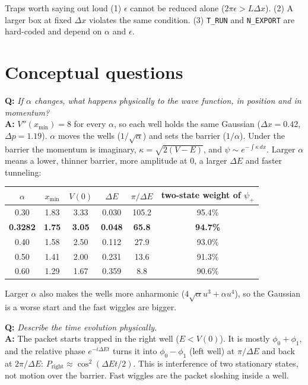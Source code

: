\documentclass[10pt]{article}
\newcommand{\code}[1]{\texttt{#1}}
\newcommand{\q}[1]{\textbf{Q:} \emph{#1}\\[1pt]}
\newcommand{\ans}{\textbf{A:} }
\begin{document}
\begin{trapbox}{Traps worth saying out loud}
(1) $\epsilon$ cannot be reduced alone ($2\pi\epsilon>L\Delta x$). (2) A larger box at fixed $\Delta x$ violates the same condition. (3) \code{T\_RUN} and \code{N\_EXPORT} are hard-coded and depend on $\alpha$ and $\epsilon$.
\end{trapbox}

\section{Conceptual questions}
\q{If $\alpha$ changes, what happens physically to the wave function, in position and in momentum?}\ans $V''(x_{\min})=8$ for every $\alpha$, so each well holds the same Gaussian ($\Delta x=0.42$, $\Delta p=1.19$). $\alpha$ moves the wells ($1/\sqrt\alpha$) and sets the barrier ($1/\alpha$). Under the barrier the momentum is imaginary, $\kappa=\sqrt{2(V-E)}$, and $\psi\sim e^{-\int\kappa\,dx}$. Larger $\alpha$ means a lower, thinner barrier, more amplitude at $0$, a larger $\Delta E$ and faster tunneling:
\begin{center}\small
\begin{tabular}{@{}cccccc@{}}\toprule
$\alpha$ & $x_{\min}$ & $V(0)$ & $\Delta E$ & $\pi/\Delta E$ & two-state weight of $\psi_+$\\\midrule
0.30 & 1.83 & 3.33 & 0.030 & 105.2 & 95.4\%\\
\textbf{0.3282} & \textbf{1.75} & \textbf{3.05} & \textbf{0.048} & \textbf{65.8} & \textbf{94.7\%}\\
0.40 & 1.58 & 2.50 & 0.112 & 27.9 & 93.0\%\\
0.50 & 1.41 & 2.00 & 0.231 & 13.6 & 91.3\%\\
0.60 & 1.29 & 1.67 & 0.359 & 8.8 & 90.6\%\\\bottomrule
\end{tabular}
\end{center}
Larger $\alpha$ also makes the wells more anharmonic ($4\sqrt\alpha u^3+\alpha u^4$), so the Gaussian is a worse start and the fast wiggles are bigger.

\q{Describe the time evolution physically.}\ans The packet starts trapped in the right well ($E<V(0)$). It is mostly $\phi_0+\phi_1$, and the relative phase $e^{-i\Delta Et}$ turns it into $\phi_0-\phi_1$ (left well) at $\pi/\Delta E$ and back at $2\pi/\Delta E$: $P_\text{right}\approx\cos^2(\Delta Et/2)$. This is interference of two stationary states, not motion over the barrier. Fast wiggles are the packet sloshing inside a well.
\end{document}
